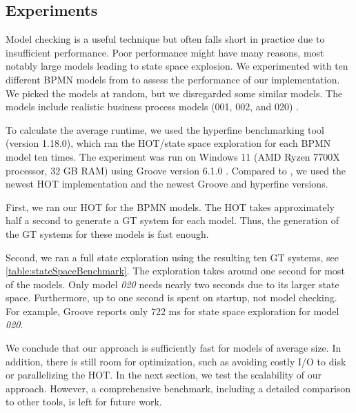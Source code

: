 \documentclass{lmcs} %
\begin{document}
\subsection{Experiments}

Model checking is a useful technique but often falls short in practice due to insufficient performance.
Poor performance might have many reasons, most notably large models leading to state space explosion.
We experimented with ten different BPMN models from \cite{houhouFirstOrderLogicVerification2022} to assess the performance of our implementation.
We picked the models at random, but we disregarded some similar models.
The models include realistic business process models (001, 002, and 020) \cite{houhouFirstOrderLogicVerification2022}.

To calculate the average runtime, we used the hyperfine benchmarking tool \cite{peterHyperfine2023} (version 1.18.0), which ran the HOT/state space exploration for each BPMN model ten times.
The experiment was run on Windows 11 (AMD Ryzen 7700X processor, 32 GB RAM) using Groove version 6.1.0 \cite{timkrauterLMCS2024Artifacts2023}.
Compared to \cite{krauterFormalizationAnalysisBPMN2023}, we used the newest HOT implementation and the newest Groove and hyperfine versions.

First, we ran our HOT for the BPMN models.
The HOT takes approximately half a second to generate a GT system for each model.
Thus, the generation of the GT systems for these models is fast enough.

Second, we ran a full state exploration using the resulting ten GT systems, see \autoref{table:stateSpaceBenchmark}.
The exploration takes around one second for most of the models.
Only model \textit{020} needs nearly two seconds due to its larger state space.
Furthermore, up to one second is spent on startup, not model checking.
For example, Groove reports only 722 ms for state space exploration for model \textit{020}.

We conclude that our approach is sufficiently fast for models of average size.
In addition, there is still room for optimization, such as avoiding costly I/O to disk or parallelizing the HOT.
In the next section, we test the scalability of our approach.
However, a comprehensive benchmark, including a detailed comparison to other tools, is left for future work.
\end{document}

